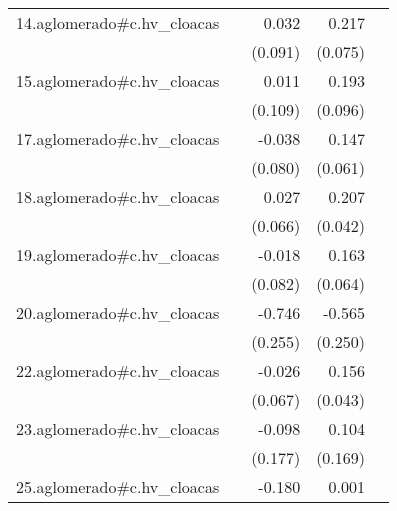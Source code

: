 {\begin{longtable}{l*{4}{D{.}{.}{-1}}}
\addlinespace
14.aglomerado#c.hv\_cloacas&                     &       0.032         &       0.217\sym{**} &                     \\
            &                     &     (0.091)         &     (0.075)         &                     \\
\addlinespace
15.aglomerado#c.hv\_cloacas&                     &       0.011         &       0.193\sym{*}  &                     \\
            &                     &     (0.109)         &     (0.096)         &                     \\
\addlinespace
17.aglomerado#c.hv\_cloacas&                     &      -0.038         &       0.147\sym{*}  &                     \\
            &                     &     (0.080)         &     (0.061)         &                     \\
\addlinespace
18.aglomerado#c.hv\_cloacas&                     &       0.027         &       0.207\sym{***}&                     \\
            &                     &     (0.066)         &     (0.042)         &                     \\
\addlinespace
19.aglomerado#c.hv\_cloacas&                     &      -0.018         &       0.163\sym{*}  &                     \\
            &                     &     (0.082)         &     (0.064)         &                     \\
\addlinespace
20.aglomerado#c.hv\_cloacas&                     &      -0.746\sym{**} &      -0.565\sym{*}  &                     \\
            &                     &     (0.255)         &     (0.250)         &                     \\
\addlinespace
22.aglomerado#c.hv\_cloacas&                     &      -0.026         &       0.156\sym{***}&                     \\
            &                     &     (0.067)         &     (0.043)         &                     \\
\addlinespace
23.aglomerado#c.hv\_cloacas&                     &      -0.098         &       0.104         &                     \\
            &                     &     (0.177)         &     (0.169)         &                     \\
\addlinespace
25.aglomerado#c.hv\_cloacas&                     &      -0.180\sym{*}  &       0.001         &                     \\

\end{longtable}}
